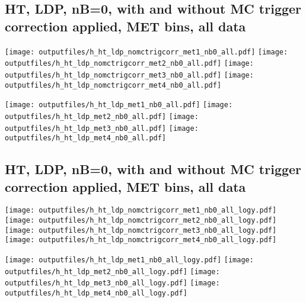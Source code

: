 \documentclass[11pt]{article}
\begin{document}
   \clearpage
     \subsection{ HT, LDP, nB=0, with and without MC trigger correction applied, MET bins, all data}

    \noindent
     \texttt{[image: outputfiles/h\_ht\_ldp\_nomctrigcorr\_met1\_nb0\_all.pdf]}
     \texttt{[image: outputfiles/h\_ht\_ldp\_nomctrigcorr\_met2\_nb0\_all.pdf]}
     \texttt{[image: outputfiles/h\_ht\_ldp\_nomctrigcorr\_met3\_nb0\_all.pdf]}
     \texttt{[image: outputfiles/h\_ht\_ldp\_nomctrigcorr\_met4\_nb0\_all.pdf]}

    \noindent
     \texttt{[image: outputfiles/h\_ht\_ldp\_met1\_nb0\_all.pdf]}
     \texttt{[image: outputfiles/h\_ht\_ldp\_met2\_nb0\_all.pdf]}
     \texttt{[image: outputfiles/h\_ht\_ldp\_met3\_nb0\_all.pdf]}
     \texttt{[image: outputfiles/h\_ht\_ldp\_met4\_nb0\_all.pdf]}

   \clearpage
     \subsection{ HT, LDP, nB=0, with and without MC trigger correction applied, MET bins, all data}

    \noindent
     \texttt{[image: outputfiles/h\_ht\_ldp\_nomctrigcorr\_met1\_nb0\_all\_logy.pdf]}
     \texttt{[image: outputfiles/h\_ht\_ldp\_nomctrigcorr\_met2\_nb0\_all\_logy.pdf]}
     \texttt{[image: outputfiles/h\_ht\_ldp\_nomctrigcorr\_met3\_nb0\_all\_logy.pdf]}
     \texttt{[image: outputfiles/h\_ht\_ldp\_nomctrigcorr\_met4\_nb0\_all\_logy.pdf]}

    \noindent
     \texttt{[image: outputfiles/h\_ht\_ldp\_met1\_nb0\_all\_logy.pdf]}
     \texttt{[image: outputfiles/h\_ht\_ldp\_met2\_nb0\_all\_logy.pdf]}
     \texttt{[image: outputfiles/h\_ht\_ldp\_met3\_nb0\_all\_logy.pdf]}
     \texttt{[image: outputfiles/h\_ht\_ldp\_met4\_nb0\_all\_logy.pdf]}

   \clearpage
\end{document}

